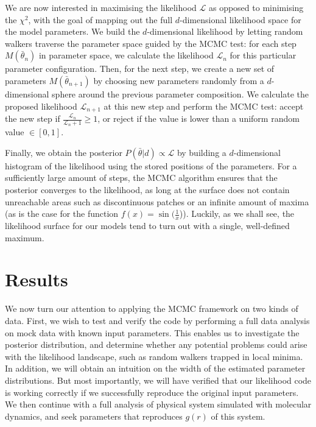\documentclass[aps,pre,twocolumn,letterpaper,floatfix,showpacs]{revtex4}
\begin{document}
We are now interested in maximising the likelihood $\mathcal L$ as opposed to
minimising the $\chi^2$, with the goal of mapping out the full $d$-dimensional
likelihood space for the model parameters. We build the $d$-dimensional likelihood
by letting random walkers traverse the parameter space guided by the MCMC test:
for each step $M(\bar \theta_{n})$ in parameter space, we calculate the likelihood
$\mathcal L_n$ for this particular parameter configuration. Then, for the next
step, we create a new set of parameters $M(\bar \theta_{n+1})$ by choosing new
parameters randomly from a $d$-dimensional sphere around the previous parameter
composition. We calculate the proposed
likelihood $\mathcal L_{n+1}$ at this new step and perform the MCMC test: accept
the new step if $\frac{\mathcal L_n}{\mathcal L_n+1} \ge 1$, or reject if the value
is lower than a uniform random value $\in [0,1]$. 

Finally, we obtain the posterior $P(\bar \theta | d) \propto \mathcal L$ by building
a $d$-dimensional histogram of the likelihood using the stored positions of the parameters.
For a sufficiently large amount of steps, the MCMC algorithm ensures that the posterior
converges to the likelihood, as long at the surface does not contain unreachable areas
such as discontinuous patches or an infinite amount of maxima (as is the case for the
function $f(x)=\sin(\frac{1}{x}$)). Luckily, as we shall see, the likelihood surface for
our models tend to turn out with a single, well-defined maximum.  


\section{Results}
We now turn our attention to applying the MCMC framework on two kinds of data.
First, we wish to test and verify the code by performing a full data analysis on
mock data with known input parameters. This enables us to investigate the posterior
distribution, and determine whether any potential problems could arise with the
likelihood landscape, such as random walkers trapped in local minima. In addition,
we will obtain an intuition on the width of the estimated parameter distributions.
But most importantly, we will have verified that our likelihood code is working correctly
if we successfully reproduce the original input parameters. We then continue with a
full analysis of physical system simulated with molecular dynamics, and seek parameters that reproduces $g(r)$ of this system.
\end{document}
